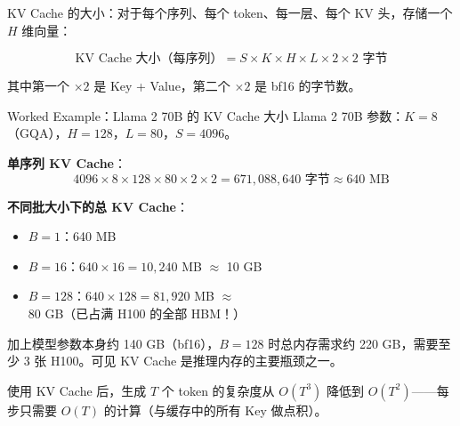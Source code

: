 KV Cache 的大小：对于每个序列、每个 token、每一层、每个 KV 头，存储一个 $H$ 维向量：

$$\text{KV Cache 大小（每序列）} = S \times K \times H \times L \times 2 \times 2 \text{ 字节}$$

其中第一个 $\times 2$ 是 Key + Value，第二个 $\times 2$ 是 bf16 的字节数。

\begin{knowledgebox}{Worked Example：Llama 2 70B 的 KV Cache 大小}
Llama 2 70B 参数：$K=8$（GQA），$H=128$，$L=80$，$S=4096$。

\textbf{单序列 KV Cache}：
$$4096 \times 8 \times 128 \times 80 \times 2 \times 2 = 671{,}088{,}640 \text{ 字节} \approx 640 \text{ MB}$$

\textbf{不同批大小下的总 KV Cache}：
\begin{itemize}
    \item $B=1$：640 MB
    \item $B=16$：$640 \times 16 = 10{,}240$ MB $\approx$ 10 GB
    \item $B=128$：$640 \times 128 = 81{,}920$ MB $\approx$ 80 GB（已占满 H100 的全部 HBM！）
\end{itemize}

加上模型参数本身约 140 GB（bf16），$B=128$ 时总内存需求约 220 GB，需要至少 3 张 H100。可见 KV Cache 是推理内存的主要瓶颈之一。
\end{knowledgebox}

使用 KV Cache 后，生成 $T$ 个 token 的复杂度从 $O(T^3)$ 降低到 $O(T^2)$——每步只需要 $O(T)$ 的计算（与缓存中的所有 Key 做点积）。

